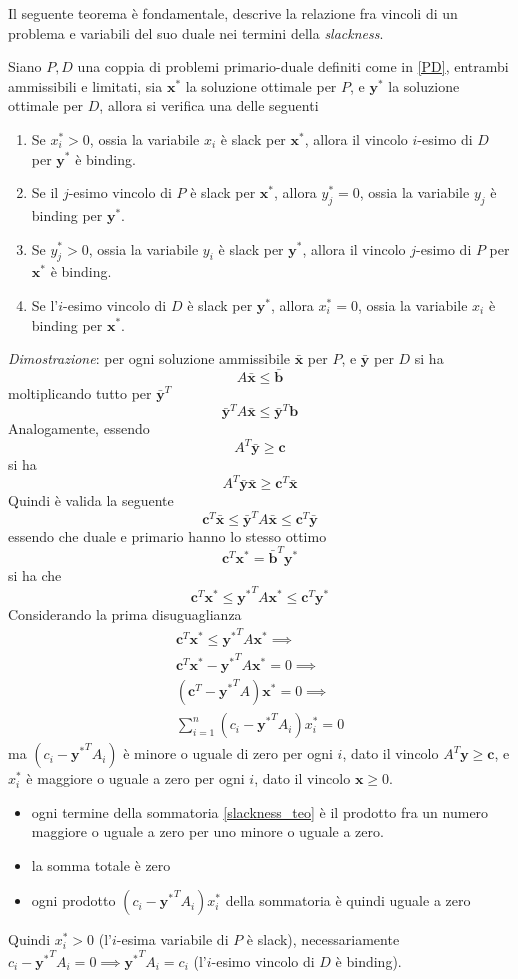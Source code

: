 \documentclass[10pt, letterpaper]{report}
\newcommand{\bb}{{\mathbf{b}}}
\newcommand{\bc}{{\mathbf{c}}}
\newcommand{\x}{{\mathbf{x}}}
\newcommand{\y}{{\mathbf{y}}}
\begin{document}
Il seguente teorema è fondamentale, descrive la relazione fra vincoli di un problema e variabili del suo duale nei termini della \textit{slackness}.
\begin{teorema}\label{complementary_slackness}
    Siano $P,D$ una coppia di problemi primario-duale definiti come in \ref{PD}, entrambi ammissibili e limitati, sia $\x^*$ la soluzione ottimale per $P$, e $\y^*$ la soluzione ottimale per $D$, allora si verifica una delle seguenti\begin{enumerate}
        \item Se $x^*_i>0$, ossia la variabile $x_i$ è slack per $\x^*$, allora il vincolo $i$-esimo di $D$ per $\y^*$ è binding.
        \item Se il $j$-esimo vincolo di $P$ è slack per $\x^*$, allora $y^*_j=0$, ossia
        la variabile $y_j$ è binding per $\y^*$.
        \item Se $y^*_j>0$, ossia la variabile $y_i$ è slack per $\y^*$, allora il vincolo $j$-esimo di $P$ per $\x^*$ è binding.
        \item Se l'$i$-esimo vincolo di $D$ è slack per $\y^*$, allora $x^*_i=0$, ossia
        la variabile $x_i$ è binding per $\x^*$.
    \end{enumerate}
\end{teorema}
\textit{Dimostrazione}: per ogni soluzione ammissibile $\bar\x$ per $P$, e $\bar\y$ per $D$ si ha 
$$ A\bar\x\le\bar \bb$$
moltiplicando tutto per $\bar\y^T$
$$ \bar\y^TA\bar\x\le \bar\y^T\bb$$
Analogamente, essendo 
$$ A^T\bar\y\ge \bc$$
si ha 
$$ A^T\bar\y\bar\x\ge \bc^T\bar\x$$
Quindi è valida la seguente\begin{equation}
    \bc^T\bar\x\le\bar\y^TA\bar\x\le\bc^T\bar\y
\end{equation}
essendo che duale e primario hanno lo stesso ottimo 
$$ \bc^T\x^*=\bar\bb^T\y^*$$
si ha che 
\begin{equation}
     \bc^T\x^*\le{\y^*}^TA\x^*\le\bc^T\y^*
\end{equation}
Considerando la prima disuguaglianza \begin{eqnarray}
     \bc^T\x^*\le{\y^*}^TA\x^*\implies \\
      \bc^T\x^*-{\y^*}^TA\x^*=0\implies \\
      (\bc^T-{\y^*}^TA)\x^*=0 \implies \\ \label{slackness_teo}
      \sum_{i=1}^n(c_i-{\y^*}^TA_i)x^*_i=0
\end{eqnarray}
ma $(c_i-{\y^*}^TA_i)$ è minore o uguale di zero per ogni $i$, dato il vincolo $A^T\y\ge\bc$, e $x_i^*$ è maggiore o uguale a zero per ogni $i$, dato il vincolo $\x\ge 0$.\begin{itemize}
    \item ogni termine della sommatoria \ref{slackness_teo} è il prodotto fra un numero maggiore o uguale a zero per uno minore o uguale a zero.
    \item la somma totale è zero 
    \item ogni prodotto $(c_i-{\y^*}^TA_i)x^*_i$ della sommatoria è quindi uguale a zero
\end{itemize}
Quindi $x_i^*>0$ (l'$i$-esima variabile di $P$ è slack), necessariamente $c_i-{\y^*}^TA_i=0\implies {\y^*}^TA_i=c_i$ (l'$i$-esimo vincolo di $D$ è binding). 
\end{document}
